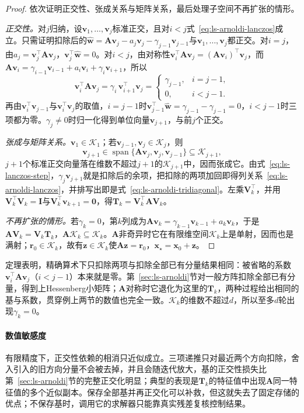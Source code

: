 \begin{proof}
依次证明正交性、张成关系与矩阵关系，最后处理子空间不再扩张的情形。

\emph{正交性。}对$j$归纳，设$\bm v_1,\ldots,\bm v_j$标准正交，且对$i<j$式~\eqref{eq:ls-arnoldi-lanczos}成立。只需证明扣除后的$\hat{\bm w}=\bm A\bm v_j-a_j\bm v_j-\gamma_{j-1}\bm v_{j-1}$与$\bm v_1,\ldots,\bm v_j$都正交。对$i=j$，由$a_j=\bm v_j^\top\bm A\bm v_j$，$\bm v_j^\top\hat{\bm w}=0$。对$i<j$，由对称性$\bm v_i^\top\bm A\bm v_j=(\bm A\bm v_i)^\top\bm v_j$，而$\bm A\bm v_i=\gamma_{i-1}\bm v_{i-1}+a_i\bm v_i+\gamma_i\bm v_{i+1}$，所以
\[
 \bm v_i^\top\bm A\bm v_j=\gamma_i\,\bm v_{i+1}^\top\bm v_j=
 \begin{cases}\gamma_{j-1},&i=j-1,\\0,&i<j-1.\end{cases}
\]
再由$\bm v_i^\top\bm v_{j-1}$与$\bm v_i^\top\bm v_j$的取值，$i=j-1$时$\bm v_{j-1}^\top\hat{\bm w}=\gamma_{j-1}-\gamma_{j-1}=0$，$i<j-1$时三项都为零。$\gamma_j\ne0$时归一化得到单位向量$\bm v_{j+1}$，与前$j$个正交。

\emph{张成与矩阵关系。}$\bm v_1\in\mathcal K_1$；若$\bm v_{j-1},\bm v_j\in\mathcal K_j$，则
\[
 \bm v_{j+1}\in\operatorname{span}\{\bm A\bm v_j,\bm v_j,\bm v_{j-1}\}\subseteq\mathcal K_{j+1},
\]
$j+1$个标准正交向量落在维数不超过$j+1$的$\mathcal K_{j+1}$中，因而张成它。由式~\eqref{eq:ls-lanczos-step}，$\gamma_j\bm v_{j+1}$就是扣除后的余项，把扣除的两项加回即得列关系~\eqref{eq:ls-arnoldi-lanczos}，并排写出即是式~\eqref{eq:ls-arnoldi-tridiagonal}。左乘$\bm V_k^\top$，并用$\bm V_k^\top\bm V_k=\bm I$与$\bm V_k^\top\bm v_{k+1}=\bm 0$，得$\bm T_k=\bm V_k^\top\bm A\bm V_k$。

\emph{不再扩张的情形。}若$\gamma_k=0$，第$k$列成为$\bm A\bm v_k=\gamma_{k-1}\bm v_{k-1}+a_k\bm v_k$，于是$\bm A\bm V_k=\bm V_k\bm T_k$，$\bm A\mathcal K_k\subseteq\mathcal K_k$。$\bm A$非奇异时它在有限维空间$\mathcal K_k$上是单射，因而也是满射；$\bm r_0\in\mathcal K_k$，故有$\bm z\in\mathcal K_k$使$\bm A\bm z=\bm r_0$，$\bm x_\star=\bm x_0+\bm z$。
\end{proof}

定理表明，精确算术下只扣除两项与扣除全部已有分量结果相同：被省略的系数$\bm v_i^\top\bm A\bm v_j$（$i<j-1$）本来就是零。第~\ref{sec:ls-arnoldi}节对一般方阵扣除全部已有分量，得到上Hessenberg小矩阵；$\bm A$对称时它退化为这里的$\bm T_k$，两种过程给出相同的基与系数，贯穿例上两节的数值也完全一致。$\mathcal K_k$的维数不超过$d$，所以至多$d$轮出现$\gamma_k=0$。

\paragraph{数值敏感度}
有限精度下，正交性依赖的相消只近似成立。三项递推只对最近两个方向扣除，舍入引入的旧方向分量不会被去掉，并且会随迭代放大，基的正交性损失比第~\ref{sec:ls-arnoldi}节的完整正交化明显；典型的表现是$\bm T_k$的特征值中出现$\bm A$同一特征值的多个近似副本。保存全部基并再正交化可以补救，但这就失去了固定存储的优点；不保存基时，调用它的求解器只能靠真实残差复核控制结果。

